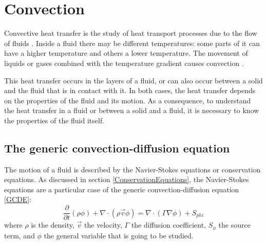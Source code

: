 \chapter{Convection}
Convective heat transfer is the study of heat transport processes due to the flow of fluids \cite{Bejan2013}. Inside a fluid there may be different temperatures: some parts of it can have a higher temperature and others a lower temperature. The movement of liquids or gases combined with the temperature gradient causes convection \cite{Bergman2011}.

This heat transfer occurs in the layers of a fluid, or can also occur between a solid and the fluid that is in contact with it. In both cases, the heat transfer depends on the properties of the fluid and its motion. As a consequence, to understand the heat transfer in a fluid or between a solid and a fluid, it is necessary to know the properties of the fluid itself.

\section{The generic convection-diffusion equation}
The motion of a fluid is described by the Navier-Stokes equations or conservation equations. As discussed in section \ref{ConservationEquations}, the Navier-Stokes equations are a particular case of the generic convection-diffusion equation \ref{GCDE}:
\begin{equation}
\frac{\partial}{\partial t}\left(\rho\phi\right)+\nabla\cdot\left(\rho\vec{v}\phi\right)=\nabla\cdot\left(\Gamma\nabla\phi\right)+S_{phi}
\label{GCDE}
\end{equation}
where $\rho$ is the density, $\vec{v}$ the velocity, $\Gamma$ the diffusion coefficient, $S_{\phi}$ the source term, and $\phi$ the general variable that is going to be studied.

